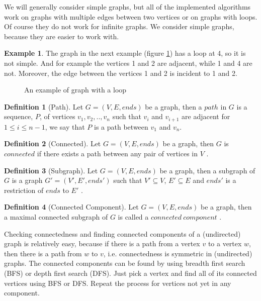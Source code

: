 \documentclass{report}
\theoremstyle{plain}
\theoremstyle{definition}
\newtheorem{definition}{Definition}
\newtheorem{example}{Example}
\theoremstyle{remark}
\numberwithin{definition}{chapter}
\numberwithin{example}{chapter}
\numberwithin{figure}{chapter}
\numberwithin{theorem}{chapter}
\numberwithin{lemma}{chapter}
\begin{document}
We will generally consider simple graphs, but all of the implemented algorithms work on graphs with multiple edges between two vertices or on graphs with loops. Of course they do not work for infinite graphs. We consider simple graphs, because they are easier to work with.

\begin{example}
The graph in the next example (figure \ref{loop}) has a loop at 4, so it is not simple. And for example the vertices 1 and 2 are adjacent, while 1 and 4 are not. Moreover, the edge between the vertices 1 and 2 is incident to 1 and 2.
\begin{figure}[h]
\center
{}
\caption{An example of graph with a loop}
\label{loop}
\end{figure}
\end{example}

\begin{definition}[Path]
Let $G = (V, E, ends)$ be a graph, then a $path$ in $G$ is a sequence, $P$, of vertices $v_1,v_2,..,v_n$ such that $v_i$ and $v_{i+1}$ are adjacent for $1 \leq i \leq n - 1$, we say that $P$ is a path between $v_1$ and $v_n$.
\end{definition}

\begin{definition}[Connected]
Let $G = (V, E, ends)$ be a graph, then $G$ is $connected$ if there exists a path between any pair of vertices in $V$ \cite{bollobas1998modern}.
\end{definition}

\begin{definition}[Subgraph]
Let $G = (V, E, ends)$ be a graph, then a subgraph of $G$ is a graph $G'=(V', E', ends')$ such that $V' \subseteq V$, $E' \subseteq E$ and $ends'$ is a restriction of $ends$ to $E'$ \cite{bondy2008graph}.
\end{definition}

\begin{definition}[Connected Component]
Let $G = (V, E, ends)$ be a graph, then a maximal connected subgraph of $G$ is called a $connected \ component$ \cite{bollobas1998modern}.
\end{definition}

Checking connectedness and finding connected components of a (undirected) graph is relatively easy, because if there is a path from a vertex $v$ to a vertex $w$, then there is a path from $w$ to $v$, i.e. connectedness is symmetric in (undirected) graphs. The connected components can be found by using breadth first search (BFS) or depth first search (DFS). Just pick a vertex and find all of its connected vertices using BFS or DFS. Repeat the process for vertices not yet in any component.
\end{document}
